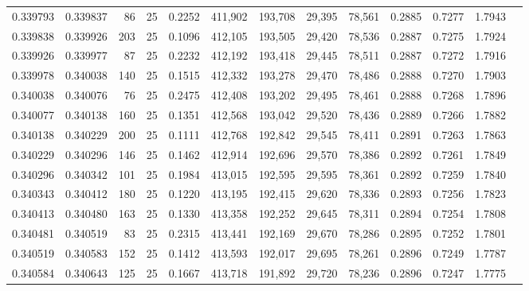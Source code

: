 \begin{tabular}{rrrrrrrrrrrrr}
0.339793 & 0.339837 &    86 &  25 &                                     0.2252 & 411,902 & 193,708 &  29,395 &  78,561 & 0.2885 & 0.7277 & 1.7943 \\
0.339838 & 0.339926 &   203 &  25 &                                     0.1096 & 412,105 & 193,505 &  29,420 &  78,536 & 0.2887 & 0.7275 & 1.7924 \\
0.339926 & 0.339977 &    87 &  25 &                                     0.2232 & 412,192 & 193,418 &  29,445 &  78,511 & 0.2887 & 0.7272 & 1.7916 \\
0.339978 & 0.340038 &   140 &  25 &                                     0.1515 & 412,332 & 193,278 &  29,470 &  78,486 & 0.2888 & 0.7270 & 1.7903 \\
0.340038 & 0.340076 &    76 &  25 &                                     0.2475 & 412,408 & 193,202 &  29,495 &  78,461 & 0.2888 & 0.7268 & 1.7896 \\
0.340077 & 0.340138 &   160 &  25 &                                     0.1351 & 412,568 & 193,042 &  29,520 &  78,436 & 0.2889 & 0.7266 & 1.7882 \\
0.340138 & 0.340229 &   200 &  25 &                                     0.1111 & 412,768 & 192,842 &  29,545 &  78,411 & 0.2891 & 0.7263 & 1.7863 \\
0.340229 & 0.340296 &   146 &  25 &                                     0.1462 & 412,914 & 192,696 &  29,570 &  78,386 & 0.2892 & 0.7261 & 1.7849 \\
0.340296 & 0.340342 &   101 &  25 &                                     0.1984 & 413,015 & 192,595 &  29,595 &  78,361 & 0.2892 & 0.7259 & 1.7840 \\
0.340343 & 0.340412 &   180 &  25 &                                     0.1220 & 413,195 & 192,415 &  29,620 &  78,336 & 0.2893 & 0.7256 & 1.7823 \\
0.340413 & 0.340480 &   163 &  25 &                                     0.1330 & 413,358 & 192,252 &  29,645 &  78,311 & 0.2894 & 0.7254 & 1.7808 \\
0.340481 & 0.340519 &    83 &  25 &                                     0.2315 & 413,441 & 192,169 &  29,670 &  78,286 & 0.2895 & 0.7252 & 1.7801 \\
0.340519 & 0.340583 &   152 &  25 &                                     0.1412 & 413,593 & 192,017 &  29,695 &  78,261 & 0.2896 & 0.7249 & 1.7787 \\
0.340584 & 0.340643 &   125 &  25 &                                     0.1667 & 413,718 & 191,892 &  29,720 &  78,236 & 0.2896 & 0.7247 & 1.7775 \\

\end{tabular}
